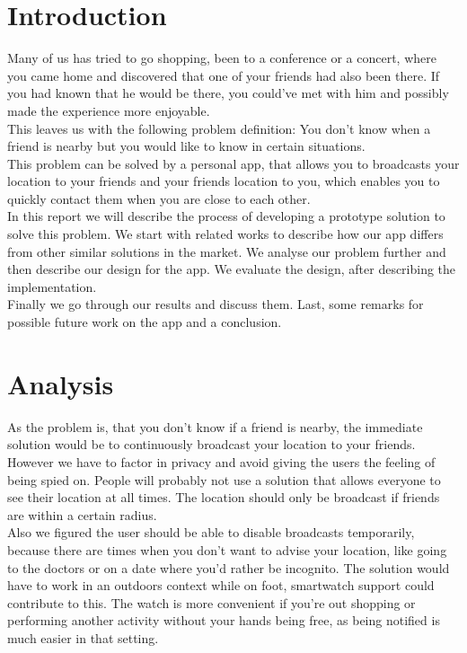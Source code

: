 \documentclass[runningheads,a4paper]{llncs}
\begin{document}
\section{Introduction}
Many of us has tried to go shopping, been to a conference or a concert, where you came home and discovered that one of your friends had also been there. If you had known that he would be there, you could’ve met with him and possibly made the experience more enjoyable.\\

This leaves us with the following problem definition: You don’t know when a friend is nearby but you would like to know in certain situations. \\

This problem can be solved by a personal app, that allows you to  broadcasts your location to your friends and your friends location to you, which enables you to quickly contact them when you are close to each other.\\

In this report we will describe the process of developing a prototype solution to solve this problem.
We start with related works to describe how our app differs from other similar solutions in the market. 
We analyse our problem further and then describe our design for the app. We evaluate the design, after describing the implementation. \\
Finally we go through our results and discuss them. Last, some remarks for possible future work on the app and a conclusion. 

\section{Analysis}
As the problem is, that you don’t know if a friend is nearby, the immediate solution would be to continuously broadcast your location to your friends.
However we have to factor in privacy and avoid giving the users the feeling of being spied on. People will probably not use a solution that allows everyone to see their location at all times. The location should only be broadcast if friends are within a certain radius.\\
Also we figured the user should be able to disable broadcasts temporarily, because there are times when you don't want to advise your location, like going to the doctors or on a date where you’d rather be incognito.
The solution would have to work in an outdoors context while on foot, smartwatch support could contribute to this. The watch is more convenient if you're out shopping or performing another activity without your hands being free, as being notified is much easier in that setting.
\end{document}
